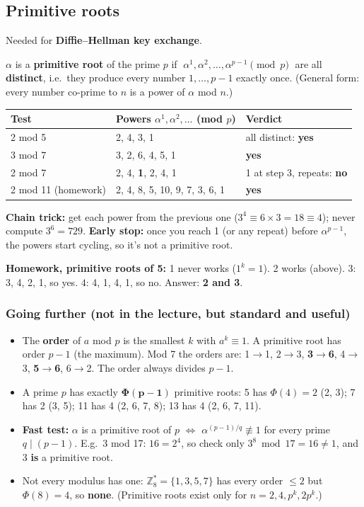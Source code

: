 \subsection{Primitive roots}
Needed for \textbf{Diffie--Hellman key exchange}.
\begin{keybox}
$\alpha$ is a \textbf{primitive root} of the prime $p$ if $\;\alpha^1, \alpha^2, \dots, \alpha^{p-1} \pmod p\;$ are all \textbf{distinct}, i.e.\ they produce every number $1, \dots, p-1$ exactly once.
(General form: every number co-prime to $n$ is a power of $\alpha$ mod $n$.)
\end{keybox}
\begin{center}\small
\begin{tabular}{@{}lll@{}}
\toprule
Test & Powers $\alpha^1, \alpha^2, \dots$ (mod $p$) & Verdict\\
\midrule
2 mod 5 & 2, 4, 3, 1 & all distinct: \textbf{yes}\\
3 mod 7 & 3, 2, 6, 4, 5, 1 & \textbf{yes}\\
2 mod 7 & 2, 4, \textbf{1}, 2, 4, 1 & 1 at step 3, repeats: \textbf{no}\\
2 mod 11 (homework) & 2, 4, 8, 5, 10, 9, 7, 3, 6, 1 & \textbf{yes}\\
\bottomrule
\end{tabular}
\end{center}
\textbf{Chain trick:} get each power from the previous one ($3^4 \equiv 6 \times 3 = 18 \equiv 4$); never compute $3^6 = 729$.
\textbf{Early stop:} once you reach 1 (or any repeat) before $\alpha^{p-1}$, the powers start cycling, so it's not a primitive root.

\textbf{Homework, primitive roots of 5:} 1 never works ($1^k = 1$). 2 works (above). $3$: 3, 4, 2, 1, so yes. $4$: 4, 1, 4, 1, so no. Answer: \textbf{2 and 3}.

\subsubsection*{Going further (not in the lecture, but standard and useful)}
\begin{itemize}
  \item The \textbf{order} of $a$ mod $p$ is the smallest $k$ with $a^k \equiv 1$. A primitive root has order $p - 1$ (the maximum).
  Mod 7 the orders are: 1$\to$1, 2$\to$3, \textbf{3$\to$6}, 4$\to$3, \textbf{5$\to$6}, 6$\to$2. The order always divides $p - 1$.
  \item A prime $p$ has exactly $\boldsymbol{\Phi(p-1)}$ primitive roots: 5 has $\Phi(4) = 2$ (2, 3); 7 has 2 (3, 5); 11 has 4 (2, 6, 7, 8); 13 has 4 (2, 6, 7, 11).
  \item \textbf{Fast test:} $\alpha$ is a primitive root of $p$ $\iff$ $\alpha^{(p-1)/q} \not\equiv 1$ for every prime $q \mid (p-1)$. E.g.\ 3 mod 17: $16 = 2^4$, so check only $3^8 \bmod 17 = 16 \ne 1$, and 3 \textbf{is} a primitive root.
  \item Not every modulus has one: $\mathbb{Z}_8^* = \{1, 3, 5, 7\}$ has every order $\le 2$ but $\Phi(8) = 4$, so \textbf{none}. (Primitive roots exist only for $n = 2, 4, p^k, 2p^k$.)
\end{itemize}

